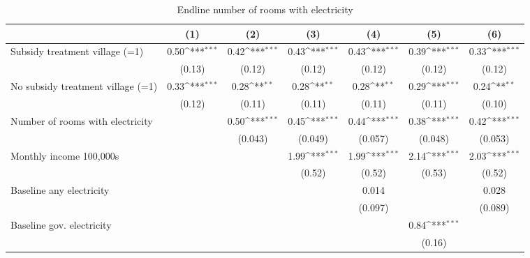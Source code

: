 \begin{table}[htbp]\centering
\def\sym#1{\ifmmode^{#1}\else\(^{#1}\)\fi}
\caption{Endline number of rooms with electricity}
\begin{tabular*}{1\hsize}{@{\hskip\tabcolsep\extracolsep\fill}l*{6}{c}}
\toprule
                &\multicolumn{1}{c}{(1)}         &\multicolumn{1}{c}{(2)}         &\multicolumn{1}{c}{(3)}         &\multicolumn{1}{c}{(4)}         &\multicolumn{1}{c}{(5)}         &\multicolumn{1}{c}{(6)}         \\
\midrule
Subsidy treatment village (=1)&     0.50\sym{***}&     0.42\sym{***}&     0.43\sym{***}&     0.43\sym{***}&     0.39\sym{***}&     0.33\sym{***}\\
                &   (0.13)         &   (0.12)         &   (0.12)         &   (0.12)         &   (0.12)         &   (0.12)         \\
No subsidy treatment village (=1)&     0.33\sym{***}&     0.28\sym{**} &     0.28\sym{**} &     0.28\sym{**} &     0.29\sym{***}&     0.24\sym{**} \\
                &   (0.12)         &   (0.11)         &   (0.11)         &   (0.11)         &   (0.11)         &   (0.10)         \\
Number of rooms with electricity&                  &     0.50\sym{***}&     0.45\sym{***}&     0.44\sym{***}&     0.38\sym{***}&     0.42\sym{***}\\
                &                  &  (0.043)         &  (0.049)         &  (0.057)         &  (0.048)         &  (0.053)         \\
Monthly income 100,000s&                  &                  &     1.99\sym{***}&     1.99\sym{***}&     2.14\sym{***}&     2.03\sym{***}\\
                &                  &                  &   (0.52)         &   (0.52)         &   (0.53)         &   (0.52)         \\
Baseline any electricity&                  &                  &                  &    0.014         &                  &    0.028         \\
                &                  &                  &                  &  (0.097)         &                  &  (0.089)         \\
Baseline gov. electricity&                  &                  &                  &                  &     0.84\sym{***}&                  \\
                &                  &                  &                  &                  &   (0.16)         &                  \\

\end{tabular*}
\end{table}
